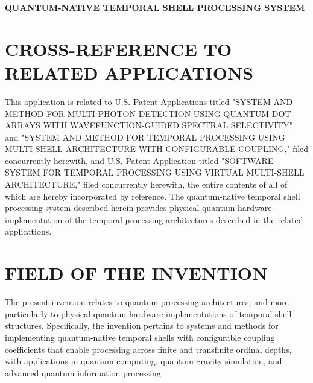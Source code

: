 \documentclass[12pt,letterpaper]{article}
\begin{document}
\begin{center}
\Large\bfseries
QUANTUM-NATIVE TEMPORAL SHELL PROCESSING SYSTEM
\end{center}

\vspace{0.5in}


\vspace{1in}

\section*{CROSS-REFERENCE TO RELATED APPLICATIONS}

This application is related to U.S. Patent Applications titled "SYSTEM AND METHOD FOR MULTI-PHOTON DETECTION USING QUANTUM DOT ARRAYS WITH WAVEFUNCTION-GUIDED SPECTRAL SELECTIVITY" and "SYSTEM AND METHOD FOR TEMPORAL PROCESSING USING MULTI-SHELL ARCHITECTURE WITH CONFIGURABLE COUPLING," filed concurrently herewith, and U.S. Patent Application titled "SOFTWARE SYSTEM FOR TEMPORAL PROCESSING USING VIRTUAL MULTI-SHELL ARCHITECTURE," filed concurrently herewith, the entire contents of all of which are hereby incorporated by reference. The quantum-native temporal shell processing system described herein provides physical quantum hardware implementation of the temporal processing architectures described in the related applications.

\section*{FIELD OF THE INVENTION}

The present invention relates to quantum processing architectures, and more particularly to physical quantum hardware implementations of temporal shell structures. Specifically, the invention pertains to systems and methods for implementing quantum-native temporal shells with configurable coupling coefficients that enable processing across finite and transfinite ordinal depths, with applications in quantum computing, quantum gravity simulation, and advanced quantum information processing.
\end{document}
